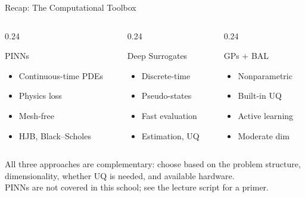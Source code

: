 \documentclass[aspectratio=169,11pt]{beamer}
\newcommand{\emphc}[1]{\textcolor{harvardcrimson}{#1}}
\begin{document}
\begin{frame}{Recap: The Computational Toolbox}
\small
\begin{columns}[T]
\begin{column}{0.24\textwidth}
\begin{block}{\small PINNs}
\scriptsize
\begin{itemize}\itemsep0pt
  \item Continuous-time PDEs
  \item Physics loss
  \item Mesh-free
  \item HJB, Black--Scholes
\end{itemize}
\end{block}
\end{column}
\begin{column}{0.24\textwidth}
\begin{block}{\small Deep Surrogates}
\scriptsize
\begin{itemize}\itemsep0pt
  \item Discrete-time
  \item Pseudo-states
  \item Fast evaluation
  \item Estimation, UQ
\end{itemize}
\end{block}
\end{column}
\begin{column}{0.24\textwidth}
\begin{block}{\small GPs + BAL}
\scriptsize
\begin{itemize}\itemsep0pt
  \item Nonparametric
  \item Built-in UQ
  \item Active learning
  \item Moderate dim
\end{itemize}
\end{block}
\end{column}
\end{columns}

\vspace{0.3cm}
All three approaches are \emphc{complementary}: choose based on the problem structure, dimensionality, whether UQ is needed, and available hardware.\\[2pt]
{\scriptsize PINNs are not covered in this school; see the lecture script for a primer.}
\end{frame}
\end{document}
